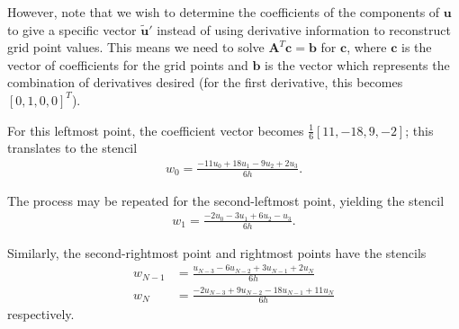\documentclass{article}
\begin{document}
\begin{enumerate}
However, note that we wish to determine the coefficients of the components of $\mathbf{u}$ to give a specific vector $\mathbf{\tilde{u}'}$ instead of using derivative information to reconstruct grid point values.
This means we need to solve $\mathbf{A}^T \mathbf{c} = \mathbf{b}$ for $\mathbf{c}$, where $\mathbf{c}$ is the vector of coefficients for the grid points and $\mathbf{b}$ is the vector which represents the combination of derivatives desired (for the first derivative, this becomes $[0, 1, 0, 0]^T$).

For this leftmost point, the coefficient vector becomes $\frac{1}{6}[11,-18,9,-2]$; this translates to the stencil
\begin{align}
w_0 = \frac{-11 u_0 + 18 u_1 - 9 u_2 + 2 u_3 }{6h}.
\end{align}

The process may be repeated for the second-leftmost point, yielding the stencil
\begin{align}
w_1 = \frac{- 2 u_0 - 3 u_1 + 6 u_2 - u_3}{6h}.
\end{align}

Similarly, the second-rightmost point and rightmost points have the stencils
\begin{align}
w_{N-1} &= \frac{u_{N-3} - 6 u_{N-2} + 3 u_{N-1} +  2 u_{N}}{6h} \\
w_{N} &= \frac{- 2 u_{N-3} + 9 u_{N-2} - 18 u_{N-1} + 11 u_{N}}{6h}
\end{align}
respectively.


\end{enumerate}
\end{document}
